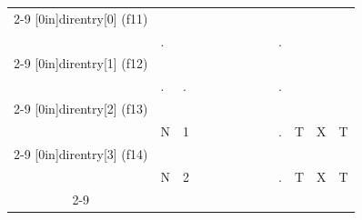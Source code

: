 \documentclass[11pt,a4paper]{article}
\begin{document}
\begin{center}

\begin{tabular}{ c   | m{0.45cm} | m{0.45cm} | m{0.45cm} | m{0.45cm} | m{0.45cm} | m{0.45cm} | m{0.45cm} | m{0.45cm} | c | m{0.45cm} | m{0.45cm} | m{0.45cm} | }
\cline{2-9} \cline{11-13}
\multirow[c]{2}{*}[0in]{direntry[0] (f11)}  &   & & & & & & & &     & & & \\
                                            & . & & & & & & & &  .  & & & \\
\cline{2-9} \cline{11-13}
\multirow[c]{2}{*}[0in]{direntry[1] (f12)}  &   &   & & & & & & &     & & & \\
                                            & . & . & & & & & & &  .  & & & \\
\cline{2-9} \cline{11-13}
\multirow[c]{2}{*}[0in]{direntry[2] (f13)}  &   &   & & & & & & &     & & & \\
                                            & N & 1 & & & & & & &  .  & T & X & T \\
\cline{2-9} \cline{11-13}
\multirow[c]{2}{*}[0in]{direntry[3] (f14)}  &   &   & & & & & & &     & & & \\
                                            & N & 2 & & & & & & &  .  & T & X & T \\
\cline{2-9} \cline{11-13}
\end{tabular}


\bigskip

\bigskip



\end{center}
\end{document}
